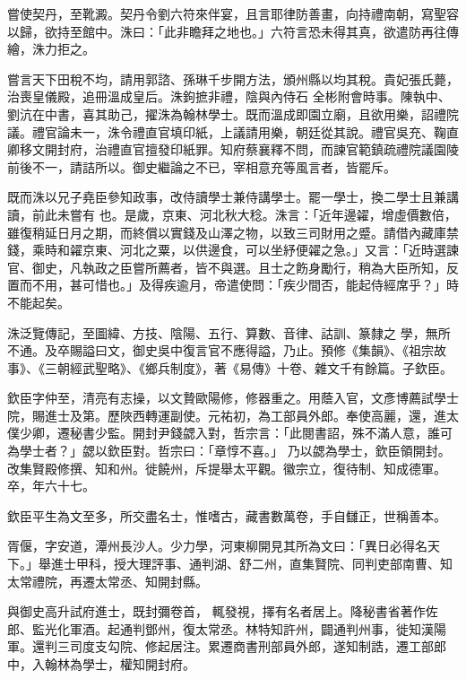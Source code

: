 \begin{pinyinscope}
 嘗使契丹，至靴澱。契丹令劉六符來伴宴，且言耶律防善畫，向持禮南朝，寫聖容以歸，欲持至館中。洙曰：「此非瞻拜之地也。」六符言恐未得其真，欲遣防再往傳繪，洙力拒之。



 嘗言天下田稅不均，請用郭諮、孫琳千步開方法，頒州縣以均其稅。貴妃張氏薨，治喪皇儀殿，追冊溫成皇后。洙鉤摭非禮，陰與內侍石
 全彬附會時事。陳執中、劉沆在中書，喜其助己，擢洙為翰林學士。既而溫成即園立廟，且欲用樂，詔禮院議。禮官論未一，洙令禮直官填印紙，上議請用樂，朝廷從其說。禮官吳充、鞠直卿移文開封府，治禮直官擅發印紙罪。知府蔡襄釋不問，而諫官範鎮疏禮院議園陵前後不一，請詰所以。御史繼論之不已，宰相意充等風言者，皆罷斥。



 既而洙以兄子堯臣參知政事，改侍讀學士兼侍講學士。罷一學士，換二學士且兼講讀，前此未嘗有
 也。是歲，京東、河北秋大稔。洙言：「近年邊糴，增虛價數倍，雖復稍延日月之期，而終償以實錢及山澤之物，以致三司財用之蹙。請借內藏庫禁錢，乘時和糴京東、河北之粟，以供邊食，可以坐紓便糴之急。」又言：「近時選諫官、御史，凡執政之臣嘗所薦者，皆不與選。且士之飭身勵行，稍為大臣所知，反置而不用，甚可惜也。」及得疾逾月，帝遣使問：「疾少間否，能起侍經席乎？」時不能起矣。



 洙泛覽傳記，至圖緯、方技、陰陽、五行、算數、音律、詁訓、篆隸之
 學，無所不通。及卒賜謚曰文，御史吳中復言官不應得謚，乃止。預修《集韻》、《祖宗故事》、《三朝經武聖略》、《鄉兵制度》，著《易傳》十卷、雜文千有餘篇。子欽臣。



 欽臣字仲至，清亮有志操，以文贄歐陽修，修器重之。用蔭入官，文彥博薦試學士院，賜進士及第。歷陜西轉運副使。元祐初，為工部員外郎。奉使高麗，還，進太僕少卿，遷秘書少監。開封尹錢勰入對，哲宗言：「此閱書詔，殊不滿人意，誰可為學士者？」勰以欽臣對。哲宗曰：「章惇不喜。」
 乃以勰為學士，欽臣領開封。改集賢殿修撰、知和州。徙饒州，斥提舉太平觀。徽宗立，復待制、知成德軍。卒，年六十七。



 欽臣平生為文至多，所交盡名士，惟嗜古，藏書數萬卷，手自讎正，世稱善本。



 胥偃，字安道，潭州長沙人。少力學，河東柳開見其所為文曰：「異日必得名天下。」舉進士甲科，授大理評事、通判湖、舒二州，直集賢院、同判吏部南曹、知太常禮院，再遷太常丞、知開封縣。



 與御史高升試府進士，既封彌卷首，
 輒發視，擇有名者居上。降秘書省著作佐郎、監光化軍酒。起通判鄧州，復太常丞。林特知許州，闢通判州事，徙知漢陽軍。還判三司度支勾院、修起居注。累遷商書刑部員外郎，遂知制誥，遷工部郎中，入翰林為學士，權知開封府。




\end{pinyinscope}
